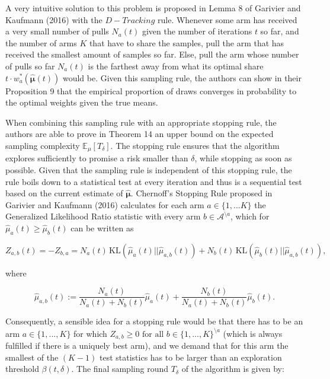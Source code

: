\documentclass[11pt,]{article}
\newcommand{\KL}{\,\text{KL}}
\begin{document}
A very intuitive solution to this problem is proposed in Lemma 8 of
Garivier and Kaufmann (2016) with the \(D-Tracking\) rule. Whenever some
arm has received a very small number of pulls \(N_a(t)\) given the
number of iterations \(t\) so far, and the number of arms \(K\) that
have to share the samples, pull the arm that has received the smallest
amount of samples so far. Else, pull the arm whose number of pulls so
far \(N_a(t)\) is the farthest away from what its optimal share
\(t\cdot w^*_a(\hat{\bm{\mu}}(t))\) would be. Given this sampling rule,
the authors can show in their Proposition 9 that the empirical
proportion of draws converges in probability to the optimal weights
given the true means.

When combining this sampling rule with an appropriate stopping rule, the
authors are able to prove in Theorem 14 an upper bound on the expected
sampling complexity \(\mathbb{E}_{\mu}[T_{\delta}]\). The stopping rule
ensures that the algorithm explores sufficiently to promise a risk
smaller than \(\delta\), while stopping as soon as possible. Given that
the sampling rule is independent of this stopping rule, the rule boils
down to a statistical test at every iteration and thus is a sequential
test based on the current estimate of \(\hat{\bm{\mu}}\). Chernoff's
Stopping Rule proposed in Garivier and Kaufmann (2016) calculates for
each arm \(a\in \{1,...K\}\) the Generalized Likelihood Ratio statistic
with every arm \(b \in \mathcal{A}^{\setminus a}\), which for
\(\hat{\mu}_a(t) \geq \hat{\mu}_b(t)\) can be written as

\begin{equation*}
Z_{a,b}(t) = - Z_{b,a} = N_a(t) \KL(\hat{\mu}_a(t) || \hat{\mu}_{a,b}(t)) + N_b(t) \KL(\hat{\mu}_{b}(t) || \hat{\mu}_{a,b}(t)),
\end{equation*}

where

\begin{equation*}
\hat{\mu}_{a,b}(t) := \frac{N_a(t)}{N_a(t) + N_b(t)}\hat{\mu}_a(t) + \frac{N_b(t)}{N_a(t) + N_b(t)}\hat{\mu}_b(t).
\end{equation*}

Consequently, a sensible idea for a stopping rule would be that there
has to be an arm \(a \in \{1,...,K\}\) for which
\(Z_{a,b} \geq 0 \text{ for all } b \in \{1,...,K\}^{\setminus a}\)
(which is always fulfilled if there is a uniquely best arm), and we
demand that for this arm the smallest of the \((K-1)\) test statistics
has to be larger than an exploration threshold \(\beta(t, \delta)\). The
final sampling round \(T_{\delta}\) of the algorithm is given by:
\end{document}
